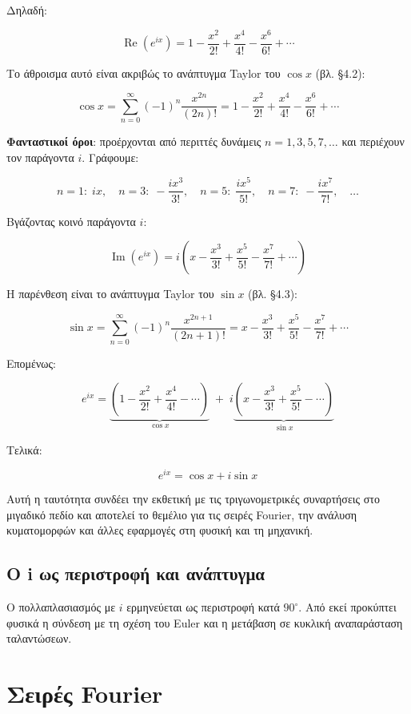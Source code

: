 \documentclass[a4paper, 11pt]{article}
\begin{document}
Δηλαδή:

\[
\operatorname{Re}(e^{ix}) = 1 - \frac{x^2}{2!} + \frac{x^4}{4!} - \frac{x^6}{6!} + \cdots
\]

Το άθροισμα αυτό είναι ακριβώς το ανάπτυγμα Taylor του \(\cos x\) (βλ.
§4.2):

\[
\cos x = \sum_{n=0}^{\infty} (-1)^n \frac{x^{2n}}{(2n)!} = 1 - \frac{x^2}{2!} + \frac{x^4}{4!} - \frac{x^6}{6!} + \cdots
\]

\textbf{Φανταστικοί όροι}: προέρχονται από περιττές δυνάμεις
\(n = 1,3,5,7,\dots\) και περιέχουν τον παράγοντα \(i\). Γράφουμε:

\[
n=1:\; i x,\quad n=3:\; -\frac{i x^3}{3!},\quad n=5:\; \frac{i x^5}{5!},\quad n=7:\; -\frac{i x^7}{7!},\quad \dots
\]

Βγάζοντας κοινό παράγοντα \(i\):

\[
\operatorname{Im}(e^{ix}) = i\left( x - \frac{x^3}{3!} + \frac{x^5}{5!} - \frac{x^7}{7!} + \cdots \right)
\]

Η παρένθεση είναι το ανάπτυγμα Taylor του \(\sin x\) (βλ. §4.3):

\[
\sin x = \sum_{n=0}^{\infty} (-1)^n \frac{x^{2n+1}}{(2n+1)!} = x - \frac{x^3}{3!} + \frac{x^5}{5!} - \frac{x^7}{7!} + \cdots
\]

Επομένως:

\[
e^{ix} = \underbrace{\left(1 - \frac{x^2}{2!} + \frac{x^4}{4!} - \cdots \right)}_{\cos x} \;+\; i\underbrace{\left(x - \frac{x^3}{3!} + \frac{x^5}{5!} - \cdots \right)}_{\sin x}
\]

Τελικά:

\[
\boxed{e^{ix} = \cos x + i\sin x}
\]

Αυτή η ταυτότητα συνδέει την εκθετική με τις τριγωνομετρικές συναρτήσεις
στο μιγαδικό πεδίο και αποτελεί το θεμέλιο για τις σειρές Fourier, την
ανάλυση κυματομορφών και άλλες εφαρμογές στη φυσική και τη μηχανική.

\subsection{Ο i ως περιστροφή και
ανάπτυγμα}\label{ux3bf-i-ux3c9ux3c2-ux3c0ux3b5ux3c1ux3b9ux3c3ux3c4ux3c1ux3bfux3c6ux3ae-ux3baux3b1ux3b9-ux3b1ux3bdux3acux3c0ux3c4ux3c5ux3b3ux3bcux3b1}

Ο πολλαπλασιασμός με \(i\) ερμηνεύεται ως περιστροφή κατά \(90^\circ\).
Από εκεί προκύπτει φυσικά η σύνδεση με τη σχέση του Euler και η μετάβαση
σε κυκλική αναπαράσταση ταλαντώσεων.

\section{Σειρές Fourier}\label{ux3c3ux3b5ux3b9ux3c1ux3adux3c2-fourier}
\end{document}
